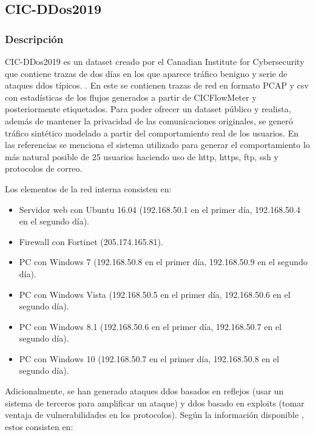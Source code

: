 \subsection{CIC-DDos2019}

\subsubsection{Descripción}

CIC-DDos2019 es un dataset creado por el Canadian Institute for Cybersecurity que contiene trazas de dos días en los que aparece tráfico benigno y serie de ataques \acrshort{ddos} típicos. \cite{cicddos2019web}. En este se contienen trazas de red en formato PCAP y \acrshort{csv} con estadísticas de los flujos generados a partir de CICFlowMeter y posteriormente etiquetados. Para poder ofrecer un dataset público y realista, además de mantener la privacidad de las comunicaciones originales, se generó tráfico sintético modelado a partir del comportamiento real de los usuarios. En las referencias se menciona el sistema utilizado para generar el comportamiento lo más natural posible de 25 usuarios haciendo uso de \acrshort{http}, \acrshort{https}, \acrshort{ftp}, \acrshort{ssh} y protocolos de correo.

Los elementos de la red interna consisten en:

\begin{itemize}
    \item Servidor web con Ubuntu 16.04 (192.168.50.1 en el primer día, 192.168.50.4 en el segundo día).
    \item Firewall con Fortinet (205.174.165.81).
    \item PC con Windows 7 (192.168.50.8 en el primer día, 192.168.50.9 en el segundo día).
    \item PC con Windows Vista (192.168.50.5 en el primer día, 192.168.50.6 en el segundo día).
    \item PC con Windows 8.1 (192.168.50.6 en el primer día, 192.168.50.7 en el segundo día).
    \item PC con Windows 10 (192.168.50.7 en el primer día, 192.168.50.8 en el segundo día).
\end{itemize}

Adicionalmente, se han generado ataques \acrshort{ddos} basados en reflejos (usar un sistema de terceros para amplificar un ataque) y \acrshort{ddos} basado en exploits (tomar ventaja de vulnerabilidades en los protocolos). Según la información disponible \cite{cicddos2019web}, estos consisten en:

